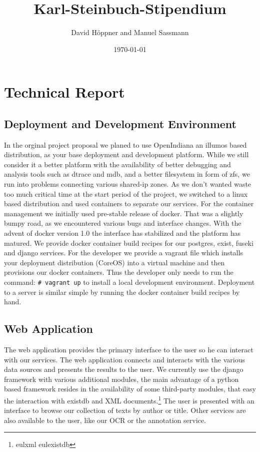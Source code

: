 \documentclass[12pt, draft]{article}
\begin{document}
\title{Karl-Steinbuch-Stipendium}
\author{David Höppner and Manuel Sassmann}
\date{\today}
\maketitle

\begin{abstract}
\end{abstract}

\section{Technical Report}

\subsection{Deployment and Development Environment}

In the orginal project proposal we planed to use OpenIndiana
an illumos based distribution, as your base deployment and development
platform.
While we still consider it a better platform with
the availability of better debugging and analysis tools
such as dtrace and mdb, and a better filesystem in form of zfs,
we run into problems connecting various shared-ip zones.
As we don't wanted waste too much critical time at the
start period of the project, we switched to a linux based
distribution and used containers to separate our
services.  For the container management we initially
used pre-stable release of docker.  That was a slightly
bumpy road, as we encountered various bugs and interface changes.
With the advent of docker version 1.0 the interface has
stabilized and the platform has matured.
We provide docker container build recipes for our
postgres, exist, fuseki and django services.
For the developer we provide a vagrant file which 
installs your deployment distribution (CoreOS)
into a virtual machine and then provisions our
docker containers.
Thus the developer only needs to run the command: \lstinline´# vagrant up´
to install a local development environment.
Deployment to a server is similar simple by running the docker container build recipes
by hand.

\subsection{Web Application}

The web application provides the primary interface to the user so he can  interact with our services.
The web application connects and interacts with the various data sources and presents
the results to the user.
We currently use the django framework with various additional modules,
the main advantage of a python based framework resides in the availability
of some third-party modules, that easy the interaction with existdb and XML
documents.\footnote{eulxml eulexistdb}
The user is presented with an interface to browse our collection of texts by
author or title.  Other services are also available to the user, like our
OCR or the annotation service.
\end{document}
